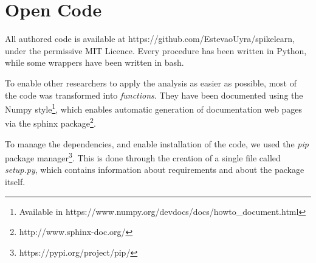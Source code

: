 \chapter{Open  Code}
All authored code is available at https://github.com/EstevaoUyra/spikelearn, under the permissive MIT Licence. Every procedure has been written in Python, while some wrappers have been written in bash.

To enable other researchers to apply the analysis as easier as possible, most of the code was transformed into \textit{functions}. They have been documented using the Numpy style\footnote{Available in https://www.numpy.org/devdocs/docs/howto\_document.html}, which enables automatic generation of documentation web pages via the sphinx package\footnote{http://www.sphinx-doc.org/}. 

To manage the dependencies, and enable installation of the code, we used the \textit{pip} package manager\footnote{https://pypi.org/project/pip/}. This is done through the creation of a single file called \textit{setup.py}, which contains information about requirements and about the package itself.
